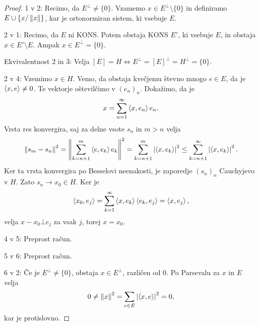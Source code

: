\begin{proof}
  1 v 2:
  Recimo, da $E^\bot \ne \{0\}$.
  Vzamemo $x \in E^\bot \setminus \{0\}$ in definiramo $E \cup \{x /
  \left\lVert x\right\rVert\}$, kar je ortonormiran sistem, ki vsebuje $E$.
  \protislovje{}

  2 v 1:
  Recimo, da $E$ ni KONS\@.
  Potem obstaja KONS $E'$, ki vsebuje $E$, in obstaja $x \in E' \setminus E$.
  Ampak $x \in E^\bot = \{0\}$.
  \protislovje{}

  Ekvivalentnost 2 in 3:
  Velja $[E] = H \iff E^\bot = [E]^\bot = H^\bot = \{0\}$.

  2 v 4:
  Vzemimo $x \in H$.
  Vemo, da obstaja kvečjemu števno mnogo $e \in E$, da je $\left< x,e \right> \ne 0$.
  Te vektorje oštevilčimo v $(e_n)_n$.
  Dokažimo, da je
  \[
	x = \sum_{n=1}^\infty \left< x, e_n \right> e_n.
  \]
  Vrsta res konvergira, saj za delne vsote $s_n$ in $m > n$ velja
  \[
	\left\lVert s_m - s_n\right\rVert^2 = \left\lVert\sum_{k=n+1}^m \left< e, e_k \right> e_k\right\rVert^2
	= \sum_{k=n+1}^m \left| \left< x, e_k \right> \right|^2
	\le \sum_{k=n+1}^\infty \left| \left< x, e_k \right> \right|^2.
  \]
  Ker ta vrsta konvergira po Besselovi neenakosti, je zaporedje $(s_n)_n$
  Cauchyjevo v $H$.
  Zato $s_n \to x_0 \in H$.
  Ker je
  \[
	\left< x_0, e_j \right> = \sum_{k=1}^\infty \left< x, e_k \right> \left< e_k, e_j \right> = \left< x, e_j \right>,
  \]
  velja $x - x_0 \bot e_j$ za vsak $j$, torej $x = x_0$.

  4 v 5:
  Preprost račun.

  5 v 6:
  Preprost račun.

  6 v 2:
  Če je $E^\bot \ne \{0\}$, obstaja $x \in E^\bot$, različen od $0$.
  Po Parsevalu za $x$ in $E$ velja
  \[
	0 \ne \left\lVert x\right\rVert^2 = \sum_{e \in E} \left| \left< x, e \right> \right|^2 = 0,
  \]
  kar je protislovno.
  \protislovje{}
\end{proof}

